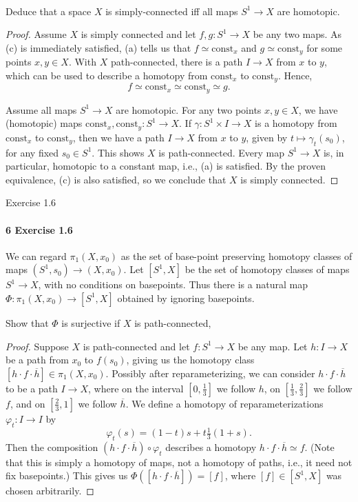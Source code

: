 \documentclass[12pt]{article}
\newlength{\myparskip}
\newenvironment{fullbox}{\begin{lrbox}{\savefullbox}\begin{minipage}{\dimexpr\textwidth-2\fboxsep\relax}\setlength{\parskip}{\myparskip}}{\end{minipage}\end{lrbox}\framebox[\textwidth]{\usebox{\savefullbox}}}
\newenvironment{pbox}[1][]{\begin{fullbox}\ifx#1\empty\else\paragraph{#1}\phantom{}\fi}{\end{fullbox}}
\theoremstyle{definition}
\renewcommand{\phi}{\varphi}
\newcommand{\<}{\langle}
\renewcommand{\>}{\rangle}
\newcommand{\htpy}{\simeq}
\newcommand{\const}{\mathrm{const}}
\begin{document}
\begin{pbox}
    Deduce that a space $X$ is simply-connected iff all maps $S^1 \to X$ are homotopic.
\end{pbox}

\begin{proof}
    Assume $X$ is simply connected and let $f, g : S^1 \to X$ be any two maps.
    As (c) is immediately satisfied, (a) tells us that $f \htpy \const_x$ and $g \htpy \const_y$ for some points $x, y \in X$.
    With $X$ path-connected, there is a path $I \to X$ from $x$ to $y$, which can be used to describe a homotopy from $\const_x$ to $\const_y$.
    Hence,
    \[
        f \htpy \const_x \htpy \const_y \htpy g.
    \]

    Assume all maps $S^1 \to X$ are homotopic.
    For any two points $x, y \in X$, we have (homotopic) maps $\const_x, \const_y : S^1 \to X$.
    If $\gamma : S^1 \times I \to X$ is a homotopy from $\const_x$ to $\const_y$, then we have a path $I \to X$ from $x$ to $y$, given by $t \mapsto \gamma_t(s_0)$, for any fixed $s_0 \in S^1$.
    This shows $X$ is path-connected.
    Every map $S^1 \to X$ is, in particular, homotopic to a constant map, i.e., (a) is satisfied.
    By the proven equivalence, (c) is also satisfied, so we conclude that $X$ is simply connected.
\end{proof}

\begin{pbox}[6 Exercise 1.6]
    We can regard $\pi_1(X, x_0)$ as the set of base-point preserving homotopy classes of maps $(S^1, s_0) \to (X, x_0)$.
    Let $[S^1, X]$ be the set of homotopy classes of maps $S^1 \to X$, with no conditions on basepoints.
    Thus there is a natural map $\Phi : \pi_1(X, x_0) \to [S^1, X]$ obtained by ignoring basepoints.

    Show that $\Phi$ is surjective if $X$ is path-connected,
\end{pbox}

\begin{proof}
    Suppose $X$ is path-connected and let $f : S^1 \to X$ be any map.
    Let $h : I \to X$ be a path from $x_0$ to $f(s_0)$, giving us the homotopy class $[h \cdot f \cdot \overline{h}] \in \pi_1(X, x_0)$.
    Possibly after reparameterizing, we can consider $h \cdot f \cdot \overline{h}$ to be a path $I \to X$, where on the interval $[0, \frac{1}{3}]$ we follow $h$, on $[\frac{1}{3}, \frac{2}{3}]$ we follow $f$, and on $[\frac{2}{3}, 1]$ we follow $\overline{h}$.
    We define a homotopy of reparameterizations $\phi_t : I \to I$ by
    \[
        \phi_t(s) = (1 - t)s + t\tfrac{1}{3}(1 + s).
    \]
    Then the composition $(h \cdot f \cdot \overline{h}) \circ \phi_t$ describes a homotopy $h \cdot f \cdot \overline{h} \htpy f$.
    (Note that this is simply a homotopy of maps, not a homotopy of paths, i.e., it need not fix basepoints.)
    This gives us $\Phi([h \cdot f \cdot \overline{h}]) = [f]$, where $[f] \in [S^1, X]$ was chosen arbitrarily.
\end{proof}
\end{document}
